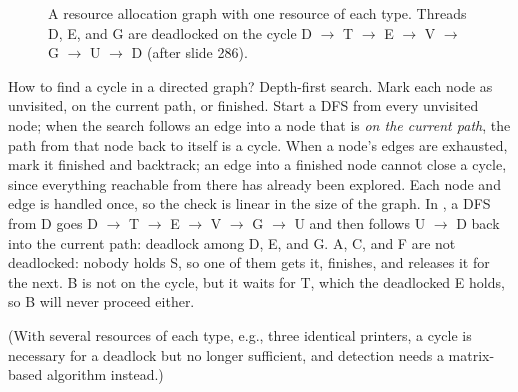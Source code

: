\begin{figure}[htbp]
\centering
{}
\caption{A resource allocation graph with one resource of each type. Threads D, E, and G are deadlocked on the cycle D $\to$ T $\to$ E $\to$ V $\to$ G $\to$ U $\to$ D (after slide 286).}
\label{fig:detect}
\end{figure}

How to find a cycle in a directed graph? Depth-first search. Mark each node as unvisited, on the current path, or finished. Start a DFS from every unvisited node; when the search follows an edge into a node that is \emph{on the current path}, the path from that node back to itself is a cycle. When a node's edges are exhausted, mark it finished and backtrack; an edge into a finished node cannot close a cycle, since everything reachable from there has already been explored. Each node and edge is handled once, so the check is linear in the size of the graph. In , a DFS from D goes D $\to$ T $\to$ E $\to$ V $\to$ G $\to$ U and then follows U $\to$ D back into the current path: deadlock among D, E, and G. A, C, and F are not deadlocked: nobody holds S, so one of them gets it, finishes, and releases it for the next. B is not on the cycle, but it waits for T, which the deadlocked E holds, so B will never proceed either.

(With several resources of each type, e.g., three identical printers, a cycle is necessary for a deadlock but no longer sufficient, and detection needs a matrix-based algorithm instead.)


